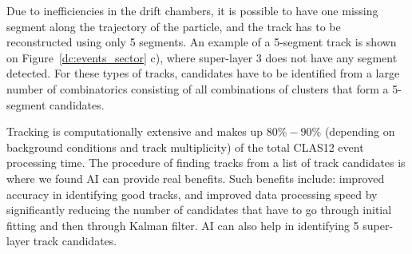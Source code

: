 Due to inefficiencies in the drift chambers, it is possible to have one missing segment along the trajectory of the particle, and the track has to be reconstructed using only 5 segments. An example of a 5-segment track is shown on Figure~\ref{dc:events_sector} c), where super-layer 3 does not have any segment detected. For these types of tracks, candidates have to be identified from a large number of combinatorics consisting of all combinations of clusters that form a  5-segment candidates. 

Tracking is computationally extensive and makes up $80\%-90\%$ (depending on background conditions and track multiplicity) of the total CLAS12 event processing time. The procedure of finding tracks from a list of track candidates is where we found AI can provide real benefits. Such benefits include: improved accuracy in identifying good tracks, and improved data processing speed by significantly reducing the number of candidates that have to go through initial fitting and then through Kalman filter. AI can also help in identifying 5 super-layer track candidates.

